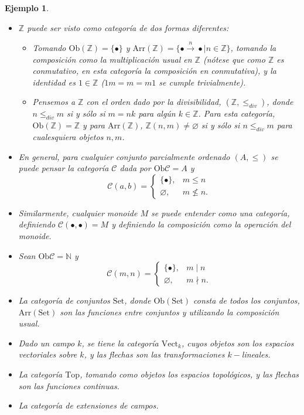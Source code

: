 \documentclass[12pt,letterpaper,titlepage]{article}
\let\emptyset\varnothing
\newtheorem*{exa}{Ejemplo}
\theoremstyle{definition}
\newcommand\N{\mathbb N}
\newcommand\Z{\mathbb Z}
\renewcommand\cal[1]{\mathcal{#1}}
\newcommand\<{\langle}
\renewcommand\>{\rangle}
\newcommand{\Con}{\mathrm{Set}}
\newcommand{\Top}{\mathrm{Top}}
\newcommand{\Vect}{\mathrm{Vect}}
\newcommand{\Ob}{\mathrm{Ob}}
\newcommand{\Arr}{\mathrm{Arr}}
\begin{document}
\begin{exa}
\begin{itemize}
    \item $\mathbb{Z}$ puede ser visto como categoría de dos formas diferentes:
        \begin{itemize}
            \item Tomando $\Ob(\Z)=\{\bullet\}$ y $\Arr(\Z)=\{\bullet\overset{n}{\to}\bullet\mid n\in\Z\}$, tomando la composición como la multiplicación usual en $\Z$ (nótese que como $\Z$ es conmutativo, en esta categoría la composición en conmutativa), y la identidad es $1\in\Z$ ($1m=m=m1$ se cumple trivialmente).
            \item Pensemos a $\Z$ con el orden dado por la divisibilidad, $(\Z, \leq_{div})$, donde $n\leq_{div}m$ si y sólo si $m=nk$ para algún $k\in \Z$.
            Para esta categoría, $\Ob(\Z)=\Z$ y para $\Arr(\Z)$, $\Z(n,m)\neq\emptyset$ si y sólo si $n\leq_{div}m$ para cualesquiera objetos $n,m$.
        \end{itemize}
        \item En general, para cualquier conjunto parcialmente ordenado $(A,\leq)$ se puede pensar la categoría $\mathcal{C}$ dada por $\Ob\cal C=A$ y 
        \[
        \cal C(a,b) =
        \begin{cases}
            \{\bullet\}, & m\leq n \\
            \emptyset, & m\nleq n.
        \end{cases}
        \]
        \item Similarmente, cualquier monoide $M$ se puede entender como una categoría, definiendo $\cal C(\bullet,\bullet)=M$ y definiendo la composición como la operación del monoide.
        \item Sean $\Ob\cal C=\N$ y
        \[
            \cal C(m,n) =
            \begin{cases}
                \{\bullet\}, & m\mid n \\
                \emptyset, & m\nmid n.
            \end{cases}
        \]
        \item La categoría de conjuntos $\Con$, donde $\Ob(\Con)$ consta de todos los conjuntos, $\Arr(\Con)$ son las funciones entre conjuntos y utilizando la composición usual.
        \item Dado un campo $k$, se tiene la categoría $\Vect_k$, cuyos objetos son los espacios vectoriales sobre $k$, y las flechas son las transformaciones $k-$lineales.
        \item La categoría $\Top$, tomando como objetos los espacios topológicos, y las flechas son las funciones continuas.
        \item La categoría de extensiones de campos.
\end{itemize}
\end{exa}
\end{document}
